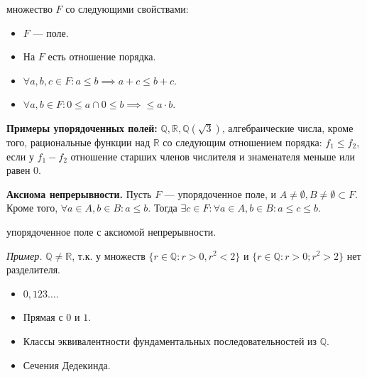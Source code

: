 \documentclass[12pt,a4paper]{article}
\begin{document}
 множество $F$ со следующими свойствами:

\begin{itemize}
	\item $F$ --- поле.
	\item На $F$ есть отношение порядка.
	\item $\forall a,b,c\in F: a\leqslant b\implies a+c\leqslant b+c$.
	\item $\forall a,b\in F:0\leqslant a\cap 0\leqslant b\implies \leqslant a\cdot b$.
\end{itemize}

\textbf{Примеры упорядоченных полей: } $\mathbb Q,\mathbb R,\mathbb Q(\sqrt3)$, алгебраические числа, кроме того, рациональные функции над $\mathbb R$ со следующим отношением порядка: $f_1\leqslant f_2$, если у $f_1-f_2$ отношение старших членов числителя и знаменателя меньше или равен 0.

\textbf{Аксиома непрерывности.} Пусть $F$ --- упорядоченное поле, и $A\neq\emptyset, B\neq\emptyset\subset F$. Кроме того, $\forall a\in A,b\in B:a\leqslant b$. Тогда $\exists c\in F:\forall a\in A,b\in B:a\leqslant c\leqslant b$.

 упорядоченное поле с аксиомой непрерывности.

\textit{Пример.} $\mathbb Q\neq \mathbb R$, т.к. у множеств $\{r\in \mathbb Q:r>0,r^2<2\}$ и $\{r\in \mathbb Q:r>0;r^2>2\}$ нет разделителя.\\


\begin{itemize}
	\item $0,123\ldots $.
	\item Прямая с $0$ и $1$.
	\item Классы эквивалентности фундаментальных последовательностей из $\mathbb Q$.
	\item Сечения Дедекинда.
\end{itemize}
\end{document}
